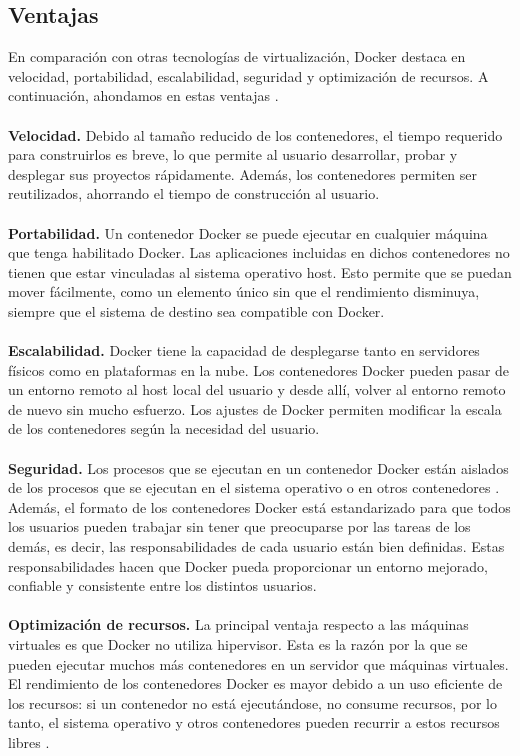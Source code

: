 \documentclass[11pt,a4paper]{article}
\begin{document}
\subsection{Ventajas}
 En comparación con otras tecnologías de virtualización, Docker destaca en velocidad, portabilidad, escalabilidad, seguridad y optimización de recursos. A continuación, ahondamos en estas ventajas \cite{rad2017introduction}.\\\\
\textbf{Velocidad.} Debido al tamaño reducido de los contenedores, el tiempo requerido para construirlos es breve, lo que permite al usuario desarrollar, probar y desplegar sus proyectos rápidamente. Además, los contenedores permiten ser reutilizados, ahorrando el tiempo de construcción al usuario.\\\\
\textbf{Portabilidad.} Un contenedor Docker se puede ejecutar en cualquier máquina que tenga habilitado Docker. Las aplicaciones incluidas en dichos contenedores no tienen que estar vinculadas al sistema operativo host. Esto permite que se puedan mover fácilmente, como un elemento único sin que el rendimiento disminuya, siempre que el sistema de destino sea compatible con Docker.\\\\
\textbf{Escalabilidad.} Docker tiene la capacidad de desplegarse tanto en servidores físicos como en plataformas en la nube. Los contenedores Docker pueden pasar de un entorno remoto al host local del usuario y desde allí, volver al entorno remoto de nuevo sin mucho esfuerzo. Los ajustes de Docker permiten modificar la escala de los contenedores según la necesidad del usuario.\\\\
\textbf{Seguridad.} Los procesos que se ejecutan en un contenedor Docker están aislados de los procesos que se ejecutan en el sistema operativo o en otros contenedores \cite{merkel2014docker}. Además, el formato de los contenedores Docker está estandarizado para que todos los usuarios pueden trabajar sin tener que preocuparse por las tareas de los demás, es decir, las responsabilidades de cada usuario están bien definidas. Estas responsabilidades hacen que Docker pueda proporcionar un entorno mejorado, confiable y consistente entre los distintos usuarios.\\\\
\textbf{Optimización de recursos.} La principal ventaja respecto a las máquinas virtuales es que Docker no utiliza hipervisor. Esta es la razón por la que se pueden ejecutar muchos más contenedores en un servidor que máquinas virtuales. El rendimiento de los contenedores Docker es mayor debido a un uso eficiente de los recursos: si un contenedor no está ejecutándose, no consume recursos, por lo tanto, el sistema operativo y otros contenedores pueden recurrir a estos recursos libres \cite{merkel2014docker}.\\\\
\end{document}
